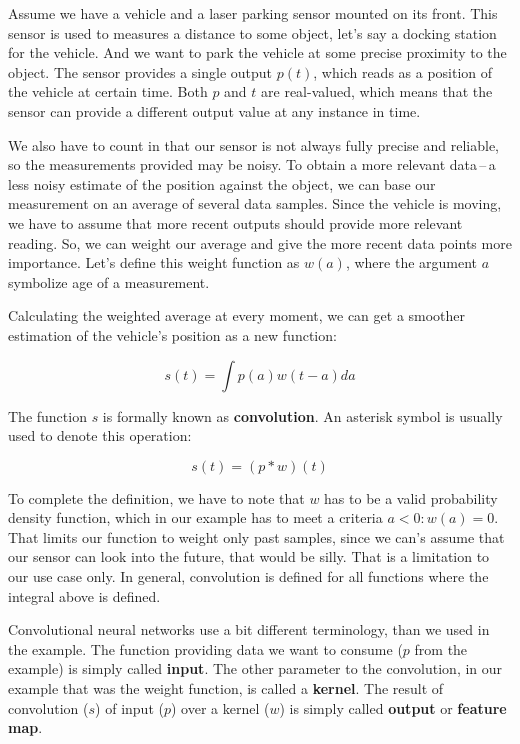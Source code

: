 Assume we have a vehicle and a laser parking sensor mounted on its front. This sensor is used to measures a distance to some object, let's say a docking station for the vehicle. And we want to park the vehicle at some precise proximity to the object. The sensor provides a single output $p(t)$, which reads as a position of the vehicle at certain time. Both $p$ and $t$ are real-valued, which means that the sensor can provide a different output value at any instance in time.

We also have to count in that our sensor is not always fully precise and reliable, so the measurements provided may be noisy. To obtain a more relevant data\,--\,a less noisy estimate of the position against the object, we can base our measurement on an average of several data samples. Since the vehicle is moving, we have to assume that more recent outputs should provide more relevant reading. So, we can weight our average and give the more recent data points more importance. Let's define this weight function as $w(a)$, where the argument $a$ symbolize age of a measurement.

Calculating the weighted average at every moment, we can get a smoother estimation of the vehicle's position as a new function:

\begin{equation}
    s(t) = \int p(a) w(t - a) da
\end{equation}


The function $s$ is formally known as \textbf{convolution}. An asterisk symbol is usually used to denote this operation:

\begin{equation}
    s(t) = (p * w)(t)
\end{equation}

To complete the definition, we have to note that $w$ has to be a valid probability density function, which in our example has to meet a criteria $a < 0: w(a) = 0$. That limits our function to weight only past samples, since we can's assume that our sensor can look into the future, that would be silly. That is a limitation to our use case only. In general, convolution is defined for all functions where the integral above is defined.

Convolutional neural networks use a bit different terminology, than we used in the example. The function providing data we want to consume ($p$ from the example) is simply called \textbf{input}. The other parameter to the convolution, in our example that was the weight function, is called a \textbf{kernel}. The result of convolution ($s$) of input ($p$) over a kernel ($w$) is simply called \textbf{output} or \textbf{feature map}.

